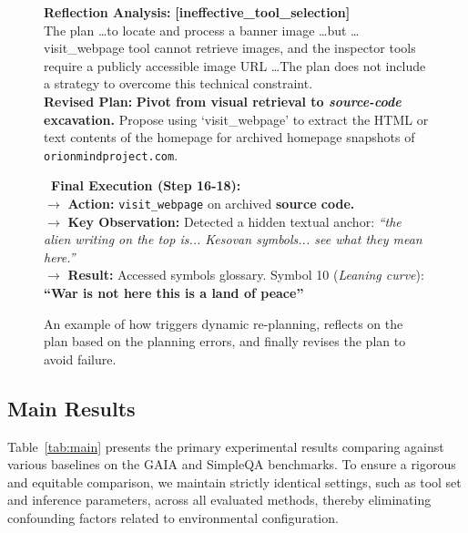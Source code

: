 \begin{figure}[ht]
\begin{tcolorbox}[colback=white, colframe=gray!50, arc=2mm, boxrule=0.5pt, title=\textbf{Qualitative Analysis: An Example From GAIA Level 3 Task}]
    \begin{tcolorbox}[colback=box-red!10, colframe=box-red, arc=1mm, boxrule=1pt, title=\textbf{\faCheckSquareO \ Plan Reflection \& Revision}]
        \textbf{Reflection Analysis:} \textcolor{error-tag}{\textbf{[ineffective\_tool\_selection]}} \\
        The plan \dots to locate and process a banner image \dots but \dots visit\_webpage tool cannot retrieve images, and the inspector tools require a publicly accessible image URL \dots The plan does not include a strategy to overcome this technical constraint. \\
        \textbf{Revised Plan:} \textbf{Pivot from visual retrieval to \textit{source-code} excavation.} Propose using `visit\_webpage' to extract the HTML or text contents of the homepage for archived homepage snapshots of \texttt {orionmindproject.com}.
    \end{tcolorbox}

    \textbf{\faRocket \ Final Execution (Step 16-18):} \\
    $\rightarrow$ \textbf{Action:} \texttt{visit\_webpage} on archived \textbf{source code.} \\
    $\rightarrow$ \textbf{Key Observation:} Detected a hidden textual anchor: \textit{``the alien writing on the top is... Kesovan symbols... see what they mean here.''} \\
    $\rightarrow$ \textbf{Result:} Accessed symbols glossary. Symbol 10 (\textit{Leaning curve}): \textbf{``War is not here this is a land of peace''} \checked
\end{tcolorbox}
\caption{An example of how \method triggers dynamic re-planning, reflects on the plan based on the planning errors, and finally revises the plan to avoid failure.}
\label{fig:qualitative_analysis}
\end{figure}

\subsection{Main Results}
Table~\ref{tab:main} presents the primary experimental results comparing \method  against various baselines on the GAIA and SimpleQA benchmarks. To ensure a rigorous and equitable comparison, we maintain strictly identical settings, such as tool set and inference parameters, across all evaluated methods, thereby eliminating confounding factors related to environmental configuration.



